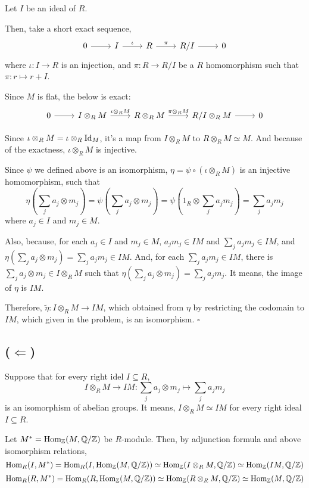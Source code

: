 \documentclass{article}
\newcommand{\qedsq}{\hfill$\square$}
\newcommand{\bbQ}{\mathbb{Q}}
\newcommand{\bbZ}{\mathbb{Z}}
\newcommand{\Hom}{\textnormal{Hom}}
\newcommand{\Id}{\textnormal{Id}}
\begin{document}
Let \(I\) be an ideal of \(R\).

Then, take a short exact sequence,
\[\begin{tikzcd}
  0 \ar[->]{r} &
  I \ar[->, "\iota"]{r} &
  R \ar[->, "\pi"]{r} &
  R/I \ar[->]{r} &
  0
\end{tikzcd}\]
where \(\iota: I \to R\) is an injection, and \(\pi: R \to R/I\) be a \(R\) homomorphism such that \(\pi: r \mapsto r + I\).

Since \(M\) is flat, the below is exact:
\[\begin{tikzcd}
  0 \ar[->]{r} &
  I \otimes_R M \ar[->, "\iota \otimes_R M"]{r} &
  R \otimes_R M \ar[->, "\pi \otimes_R M"]{r} &
  R/I \otimes_R M \ar[->]{r} &
  0
\end{tikzcd}\]

Since \(\iota \otimes_R M = \iota \otimes_R \Id_M\), it's a map from \(I \otimes_R M\) to \(R \otimes_R M \simeq M\).
And because of the exactness, \(\iota \otimes_R M\) is injective.

Since \(\psi\) we defined above is an isomorphism, \(\eta = \psi \circ (\iota \otimes_R M)\) is an injective homomorphism, such that
\[\eta(\sum_j a_j \otimes m_j) = \psi(\sum_j a_j \otimes m_j) = \psi(1_R \otimes \sum_j a_j m_j) = \sum_j a_j m_j\]
where \(a_j \in I\) and \(m_j \in M\).

Also,
because, for each \(a_j \in I\) and \(m_j \in M\),
\(a_jm_j \in IM\)
and
\(\sum_j a_j m_j \in IM\),
and \(\eta(\sum_j a_j \otimes m_j) = \sum_j a_j m_j \in IM\).
And, for each \(\sum_j a_j m_j \in I M\),
there is \(\sum_j a_j \otimes m_j \in I \otimes_R M\) such that
\(\eta(\sum_j a_j \otimes m_j) = \sum_j a_j m_j\).
It means, the image of \(\eta\) is \(IM\).

Therefore, \(\tilde{\eta}: I \otimes_R M \to IM\), which obtained from \(\eta\) by restricting the codomain to \(IM\), which given in the problem, is an isomorphism.
\qedsq

\subsection*{(\(\Longleftarrow\))}
Suppose that for every right idel \(I \subseteq R\),
\[I \otimes_R M \to IM: \sum_{j} a_j \otimes m_j \mapsto \sum_{j} a_j m_j\]
is an isomorphism of abelian groups.
It means, \(I \otimes_R M \simeq IM\) for every right ideal \(I \subseteq R\).

Let \(M^* = \Hom_\bbZ(M, \bbQ/\bbZ)\) be \(R\)-module.
Then, by adjunction formula and above isomorphism relations,
\[\Hom_R(I, M^*)
  = \Hom_R(I, \Hom_\bbZ(M, \bbQ / \bbZ))
  \simeq \Hom_\bbZ(I \otimes_R M, \bbQ / \bbZ)
  \simeq \Hom_\bbZ(I M, \bbQ / \bbZ)
\]
\[\Hom_R(R, M^*)
  = \Hom_R(R, \Hom_\bbZ(M, \bbQ / \bbZ))
  \simeq \Hom_\bbZ(R \otimes_R M, \bbQ / \bbZ)
  \simeq \Hom_\bbZ(M, \bbQ / \bbZ)
\]
\end{document}
